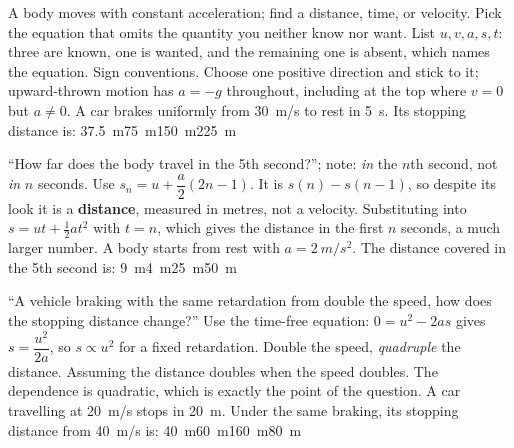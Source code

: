 {A body moves with constant acceleration; find a distance, time, or velocity.}
{Pick the equation that omits the quantity you neither know nor want. List $u,v,a,s,t$: three are
known, one is wanted, and the remaining one is absent, which names the equation.}
{Sign conventions. Choose one positive direction and stick to it; upward-thrown motion has $a=-g$
throughout, including at the top where $v=0$ but $a\ne0$.}
{A car brakes uniformly from \SI{30}{m/s} to rest in \SI{5}{s}. Its stopping distance is:}
{\SI{37.5}{m}}{\SI{75}{m}}{\SI{150}{m}}{\SI{225}{m}}

{``How far does the body travel in the 5th second?''; note: \emph{in} the $n$th second, not \emph{in}
$n$ seconds.}
{Use $s_n=u+\dfrac{a}{2}(2n-1)$. It is $s(n)-s(n-1)$, so despite its look it is a
\textbf{distance}, measured in metres, not a velocity.}
{Substituting into $s=ut+\tfrac12at^2$ with $t=n$, which gives the distance in the first $n$ seconds,
a much larger number.}
{A body starts from rest with $a=\SI{2}{m/s^2}$. The distance covered in the 5th second is:}
{\SI{9}{m}}{\SI{4}{m}}{\SI{25}{m}}{\SI{50}{m}}

{``A vehicle braking with the same retardation from double the speed, how does the stopping distance
change?''}
{Use the time-free equation: $0=u^2-2as$ gives $s=\dfrac{u^2}{2a}$, so $\boxed{s\propto u^2}$ for a fixed
retardation. Double the speed, \emph{quadruple} the distance.}
{Assuming the distance doubles when the speed doubles. The dependence is quadratic, which is exactly the
point of the question.}
{A car travelling at \SI{20}{m/s} stops in \SI{20}{m}. Under the same braking, its stopping distance
from \SI{40}{m/s} is:}
{\SI{40}{m}}{\SI{60}{m}}{\SI{160}{m}}{\SI{80}{m}}

